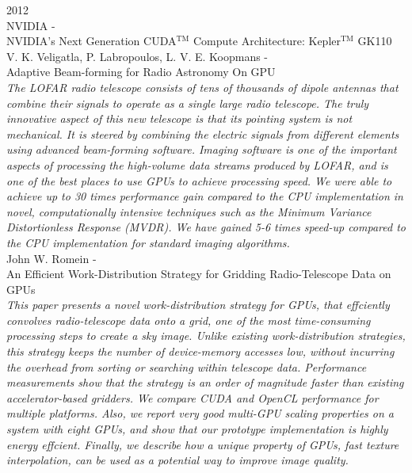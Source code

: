 \noindent
{\large 2012}\\
\noindent
{\large NVIDIA - \hfill \\
NVIDIA’s Next Generation
CUDA$^{\textrm{TM}}$ Compute Architecture: Kepler$^{\textrm{TM}}$ GK110}\\

\noindent
{\large V. K. Veligatla, P. Labropoulos, L. V. E. Koopmans - \hfill \\ Adaptive Beam-forming for Radio Astronomy On GPU }\\
\indent \textit{The LOFAR radio telescope consists of tens of thousands of dipole antennas that combine
their signals to operate as a single large radio telescope. The truly innovative aspect of
this new telescope is that its pointing system is not mechanical. It is steered by combining
the electric signals from different elements using advanced beam-forming software. Imaging
software is one of the important aspects of processing the high-volume data streams
produced by LOFAR, and is one of the best places to use GPUs to achieve processing
speed. We were able to achieve up to 30 times performance gain compared to the CPU
implementation in novel, computationally intensive techniques such as the Minimum Variance
Distortionless Response (MVDR). We have gained 5-6 times speed-up compared to
the CPU implementation for standard imaging algorithms.
}\\

\noindent
{\large John W. Romein - \hfill \\ An Efficient Work-Distribution Strategy for Gridding Radio-Telescope Data on GPUs }\\
\indent \textit{This paper presents a novel work-distribution strategy for GPUs, that effciently convolves radio-telescope data onto a grid, one of the most time-consuming processing steps to
create a sky image. Unlike existing work-distribution strategies, this strategy keeps the number of device-memory accesses low, without incurring the overhead from sorting or searching within telescope data. Performance measurements show that the strategy is an order of magnitude faster than
existing accelerator-based gridders. We compare CUDA and OpenCL performance for multiple platforms. Also, we report very good multi-GPU scaling properties on a system with eight GPUs, and show that our prototype implementation is highly energy effcient. Finally, we describe how a unique property of GPUs, fast texture interpolation, can be used as a potential way to improve image quality.
}\\

